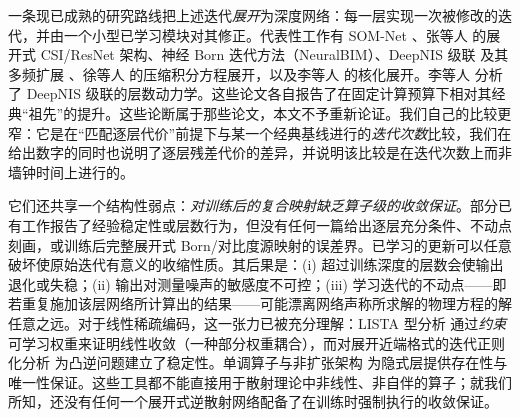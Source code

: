 \documentclass[UTF8,a4paper,11pt]{ctexart}
\begin{document}
一条现已成熟的研究路线把上述迭代\emph{展开}为深度网络：每一层实现一次被修改的迭代，并由一个小型已学习模块对其修正。代表性工作有 SOM-Net \cite{somnet}、张等人 \cite{unrolledcnn} 的展开式 CSI/ResNet 架构、神经 Born 迭代方法（NeuralBIM）\cite{neuralbim}、DeepNIS 级联 \cite{deepnis} 及其多频扩展 \cite{mfneuralbim}、徐等人 \cite{ciesomnet} 的压缩积分方程展开，以及李等人 \cite{kernelunroll} 的核化展开。李等人 \cite{li2019cnn} 分析了 DeepNIS 级联的层数动力学。这些论文各自报告了在固定计算预算下相对其经典“祖先”的提升。这些论断属于那些论文，本文不予重新论证。我们自己的比较更窄：它是在“匹配逐层代价”前提下与某一个经典基线进行的\emph{迭代次数}比较，我们在给出数字的同时也说明了逐层残差代价的差异，并说明该比较是在迭代次数上而非墙钟时间上进行的。

它们还共享一个结构性弱点：\emph{对训练后的复合映射缺乏算子级的收敛保证}。部分已有工作报告了经验稳定性或层数行为，但没有任何一篇给出逐层充分条件、不动点刻画，或训练后完整展开式 Born/对比度源映射的误差界。已学习的更新可以任意破坏使原始迭代有意义的收缩性质。其后果是：(i) 超过训练深度的层数会使输出退化或失稳；(ii) 输出对测量噪声的敏感度不可控；(iii) 学习迭代的不动点——即若重复施加该层网络所计算出的结果——可能漂离网络声称所求解的物理方程的解任意之远。对于线性稀疏编码，这一张力已被充分理解：LISTA 型分析 \cite{lista, listacp, alista} 通过\emph{约束}可学习权重来证明线性收敛（一种部分权重耦合），而对展开近端格式的迭代正则化分析 \cite{cui_reg} 为凸逆问题建立了稳定性。单调算子与非扩张架构 \cite{sherry_nonexp, mondeq} 为隐式层提供存在性与唯一性保证。这些工具都不能直接用于散射理论中非线性、非自伴的算子；就我们所知，还没有任何一个展开式逆散射网络配备了在训练时强制执行的收敛保证。
\end{document}

